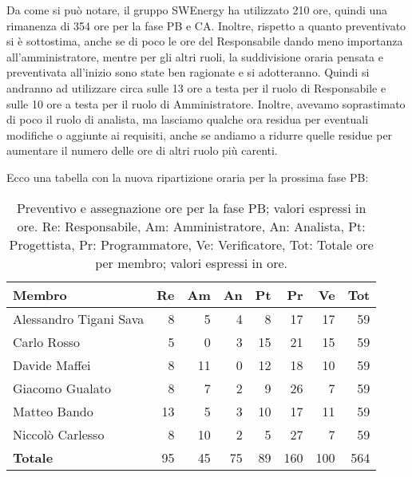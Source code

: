 Da come si può notare, il gruppo SWEnergy ha utilizzato 210 ore, quindi una rimanenza di 354 ore per la fase PB e CA.
Inoltre, rispetto a quanto preventivato si è sottostima, anche se di poco le ore del Responsabile dando meno importanza 
all'amministratore, mentre per gli altri ruoli, la suddivisione oraria pensata e preventivata all'inizio sono state ben 
ragionate e si adotteranno.
Quindi si andranno ad utilizzare circa sulle 13 ore a testa per il ruolo di Responsabile e sulle 10 ore a testa per il ruolo di Amministratore.
Inoltre, avevamo soprastimato di poco il ruolo di analista, ma lasciamo qualche ora residua per eventuali modifiche o aggiunte ai requisiti, anche se 
andiamo a ridurre quelle residue per aumentare il numero delle ore di altri ruolo più carenti.

Ecco una tabella con la nuova ripartizione oraria per la prossima fase PB:

\begin{table}[H]
	\renewcommand{\arraystretch}{1.5}
	\centering
	\begin{tabular}{l|r|r|r|r|r|r|r}
		\textbf{Membro} & \textbf{Re} & \textbf{Am} & \textbf{An} & \textbf{Pt}
		& \textbf{Pr} & \textbf{Ve} & \textbf{Tot} \\
		\hline
		Alessandro Tigani Sava 	&	8 	&  5 	& 4 	& 8 	&  17 	&  17 	&  59 \\
		Carlo Rosso 			&	5 	&  0 	& 3 	& 15 	&  21 	&  15 	&  59 \\
		Davide Maffei			&	8 	&  11 	& 0 	& 12 	&  18 	&  10 	&  59 \\
		Giacomo Gualato 		&	8 	&  7 	& 2 	& 9 	&  26 	&  7 	&  59 \\
		Matteo Bando 			&	13 	&  5 	& 3 	& 10 	&  17 	&  11 	&  59	\\
		Niccolò Carlesso 		&	8 	&  10 	& 2 	& 5 	&  27 	&  7 	&  59 \\
		\hline
		\textbf{Totale} 		&	95 & 45 & 75 & 89 & 160 & 100 & 564 \\
	\end{tabular}

	\caption{Preventivo e assegnazione ore per la fase PB; valori espressi in ore.
		Re: Responsabile, Am: Amministratore, An: Analista, Pt:
	Progettista, Pr: Programmatore, Ve: Verificatore, Tot: Totale ore per 
	membro; valori espressi in ore.}
\end{table}



